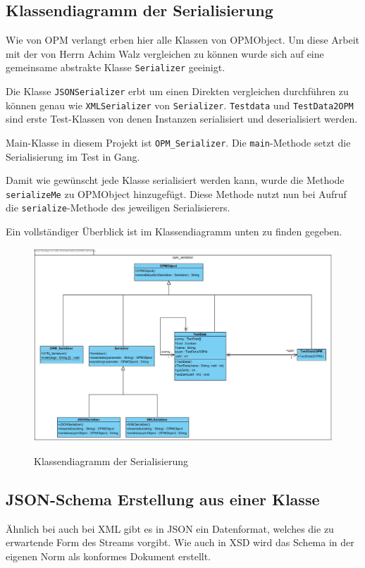 
\subsection{Klassendiagramm der Serialisierung}

Wie von OPM verlangt erben hier alle Klassen von OPMObject. Um diese Arbeit mit der von Herrn Achim Walz vergleichen zu k\"onnen wurde sich auf eine gemeinsame abstrakte Klasse \texttt{Serializer} geeinigt. 

Die Klasse \texttt{JSONSerializer} erbt um einen Direkten vergleichen durchf\"uhren zu k\"onnen genau wie \texttt{XMLSerializer} von \texttt{Serializer}.
\texttt{Testdata} und \texttt{TestData2OPM} sind erste Test-Klassen von denen Instanzen serialisiert und deserialisiert werden.

Main-Klasse in diesem Projekt ist \texttt{OPM\_Serializer}. Die \texttt{main}-Methode setzt die Serialisierung im Test in Gang.

Damit wie gew\"unscht jede Klasse serialisiert werden kann, wurde die Methode \texttt{serializeMe} zu OPMObject hinzugef\"ugt.
Diese Methode nutzt nun bei Aufruf die \texttt{serialize}-Methode des jeweiligen Serialisierers.

Ein vollst\"andiger \"Uberblick ist im Klassendiagramm unten zu finden gegeben.

\FloatBarrier
\begin{figure}[ht]
\includegraphics[width=16cm]{Bilder/Erstes_EKD}
\label{Klassendiagramm der Serialisierung}
\caption{Klassendiagramm der Serialisierung} 
\end{figure}

\subsection{JSON-Schema Erstellung aus einer Klasse}\label{JSON-Schema}
\"Ahnlich bei auch bei XML gibt es in JSON ein Datenformat, welches die zu erwartende Form des Streams vorgibt.
Wie auch in XSD wird das Schema in der eigenen Norm als konformes Dokument erstellt. \cite{JSON_Schema}

